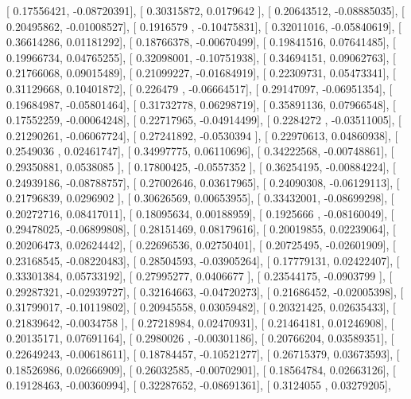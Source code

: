 \documentclass{article}
\begin{document}
       [ 0.17556421, -0.08720391],
       [ 0.30315872,  0.0179642 ],
       [ 0.20643512, -0.08885035],
       [ 0.20495862, -0.01008527],
       [ 0.1916579 , -0.10475831],
       [ 0.32011016, -0.05840619],
       [ 0.36614286,  0.01181292],
       [ 0.18766378, -0.00670499],
       [ 0.19841516,  0.07641485],
       [ 0.19966734,  0.04765255],
       [ 0.32098001, -0.10751938],
       [ 0.34694151,  0.09062763],
       [ 0.21766068,  0.09015489],
       [ 0.21099227, -0.01684919],
       [ 0.22309731,  0.05473341],
       [ 0.31129668,  0.10401872],
       [ 0.226479  , -0.06664517],
       [ 0.29147097, -0.06951354],
       [ 0.19684987, -0.05801464],
       [ 0.31732778,  0.06298719],
       [ 0.35891136,  0.07966548],
       [ 0.17552259, -0.00064248],
       [ 0.22717965, -0.04914499],
       [ 0.2284272 , -0.03511005],
       [ 0.21290261, -0.06067724],
       [ 0.27241892, -0.0530394 ],
       [ 0.22970613,  0.04860938],
       [ 0.2549036 ,  0.02461747],
       [ 0.34997775,  0.06110696],
       [ 0.34222568, -0.00748861],
       [ 0.29350881,  0.0538085 ],
       [ 0.17800425, -0.0557352 ],
       [ 0.36254195, -0.00884224],
       [ 0.24939186, -0.08788757],
       [ 0.27002646,  0.03617965],
       [ 0.24090308, -0.06129113],
       [ 0.21796839,  0.0296902 ],
       [ 0.30626569,  0.00653955],
       [ 0.33432001, -0.08699298],
       [ 0.20272716,  0.08417011],
       [ 0.18095634,  0.00188959],
       [ 0.1925666 , -0.08160049],
       [ 0.29478025, -0.06899808],
       [ 0.28151469,  0.08179616],
       [ 0.20019855,  0.02239064],
       [ 0.20206473,  0.02624442],
       [ 0.22696536,  0.02750401],
       [ 0.20725495, -0.02601909],
       [ 0.23168545, -0.08220483],
       [ 0.28504593, -0.03905264],
       [ 0.17779131,  0.02422407],
       [ 0.33301384,  0.05733192],
       [ 0.27995277,  0.0406677 ],
       [ 0.23544175, -0.0903799 ],
       [ 0.29287321, -0.02939727],
       [ 0.32164663, -0.04720273],
       [ 0.21686452, -0.02005398],
       [ 0.31799017, -0.10119802],
       [ 0.20945558,  0.03059482],
       [ 0.20321425,  0.02635433],
       [ 0.21839642, -0.0034758 ],
       [ 0.27218984,  0.02470931],
       [ 0.21464181,  0.01246908],
       [ 0.20135171,  0.07691164],
       [ 0.2980026 , -0.00301186],
       [ 0.20766204,  0.03589351],
       [ 0.22649243, -0.00618611],
       [ 0.18784457, -0.10521277],
       [ 0.26715379,  0.03673593],
       [ 0.18526986,  0.02666909],
       [ 0.26032585, -0.00702901],
       [ 0.18564784,  0.02663126],
       [ 0.19128463, -0.00360994],
       [ 0.32287652, -0.08691361],
       [ 0.3124055 ,  0.03279205],
\end{document}
